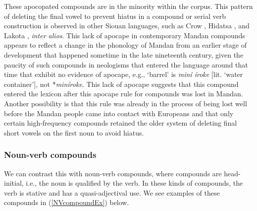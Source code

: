 These apocopated compounds are in the minority within the corpus. This pattern of deleting the final vowel to prevent hiatus in a compound or serial verb construction is observed in other Siouan languages, such as Crow \citep[50]{graczyk2007}, Hidatsa \citep[315]{park2012}, and Lakota \citep[533]{ullrichblackbear2016}, \textit{inter alios}. This lack of apocape in contemporary Mandan compounds appears to reflect a change in the phonology of Mandan from an earlier stage of development that happened sometime in the late nineteenth century, given the paucity of such compounds in neologisms that entered the language around that time that exhibit no evidence of apocape, e.g., `barrel' is \textit{miní íroke} [lit. `water container'], not *\textit{miníroke}. This lack of apocape suggests that this compound entered the lexicon after this apocape rule for compounds was lost in Mandan. Another possibility is that this rule was already in the process of being lost well before the Mandan people came into contact with Europeans and that only certain high-frequency compounds retained the older system of deleting final short vowels on the first noun to avoid hiatus.



\subsubsection{Noun-verb compounds}\label{SubSubSecNVcompounds}




We can contrast this with noun-verb compounds, where compounds are head-initial, i.e., the noun is qualified by the verb. In these kinds of compounds, the verb is stative and has a quasi-adjectival use. We see examples of these compounds in (\ref{NVcompoundEx}) below.

